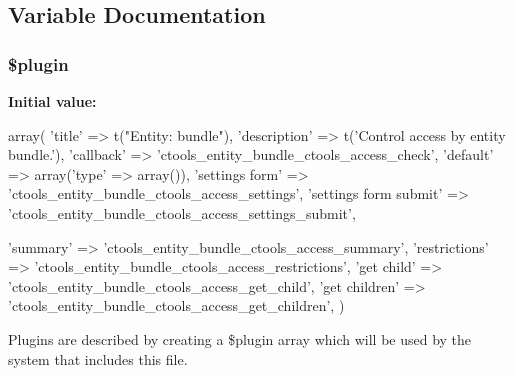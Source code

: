 \subsection{Variable Documentation}
\hypertarget{entity__bundle_8inc_ada8a7130088351710bb02ed622d6bf65}{
\subsubsection[{\$plugin}]{\setlength{\rightskip}{0pt plus 5cm}\$plugin}}
\label{entity__bundle_8inc_ada8a7130088351710bb02ed622d6bf65}
{\bfseries Initial value:}
\begin{DoxyCode}
 array(
  'title' => t("Entity: bundle"),
  'description' => t('Control access by entity bundle.'),
  'callback' => 'ctools_entity_bundle_ctools_access_check',
  'default' => array('type' => array()),
  'settings form' => 'ctools_entity_bundle_ctools_access_settings',
  'settings form submit' => 'ctools_entity_bundle_ctools_access_settings_submit',
      
  'summary' => 'ctools_entity_bundle_ctools_access_summary',
  'restrictions' => 'ctools_entity_bundle_ctools_access_restrictions',
  'get child' => 'ctools_entity_bundle_ctools_access_get_child',
  'get children' => 'ctools_entity_bundle_ctools_access_get_children',
)
\end{DoxyCode}
Plugins are described by creating a \$plugin array which will be used by the system that includes this file. 